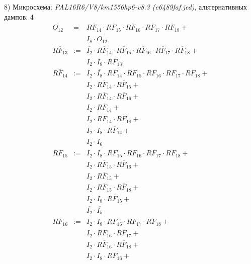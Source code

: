 \documentclass[a4paper,russian]{report}
\begin{document}
8) Микросхема: \emph{PAL16R6/V8/km1556hp6-v8.3  (e6489faf.jed)}, альтернативных дампов: 4
\nopagebreak\begin{eqnarray*}
    \overline{O_{12}} & = & \overline{RF_{14}} \cdotp \overline{RF_{15}} \cdotp \overline{RF_{16}} \cdotp \overline{RF_{17}} \cdotp \overline{RF_{18}} + \\
	& &  I_{8} \cdotp \overline{O_{12}} \\
    \overline{RF_{13}} & := & \overline{I_{2}} \cdotp \overline{RF_{14}} \cdotp \overline{RF_{15}} \cdotp \overline{RF_{16}} \cdotp \overline{RF_{17}} \cdotp \overline{RF_{18}} + \\
	& &  I_{2} \cdotp I_{8} \cdotp \overline{RF_{13}} \\
    \overline{RF_{14}} & := & I_{2} \cdotp \overline{I_{8}} \cdotp RF_{14} \cdotp RF_{15} \cdotp RF_{16} \cdotp RF_{17} \cdotp RF_{18} + \\
	& &  I_{2} \cdotp \overline{RF_{14}} \cdotp \overline{RF_{15}} + \\
	& &  I_{2} \cdotp \overline{RF_{14}} \cdotp \overline{RF_{16}} + \\
	& &  I_{2} \cdotp \overline{RF_{14}} + \\
	& &  I_{2} \cdotp \overline{RF_{14}} \cdotp \overline{RF_{18}} + \\
	& &  I_{2} \cdotp I_{8} \cdotp \overline{RF_{14}} + \\
	& &  \overline{I_{2}} \cdotp \overline{I_{6}} \\
    \overline{RF_{15}} & := & I_{2} \cdotp \overline{I_{8}} \cdotp RF_{15} \cdotp RF_{16} \cdotp RF_{17} \cdotp RF_{18} + \\
	& &  I_{2} \cdotp \overline{RF_{15}} \cdotp \overline{RF_{16}} + \\
	& &  I_{2} \cdotp \overline{RF_{15}} + \\
	& &  I_{2} \cdotp \overline{RF_{15}} \cdotp \overline{RF_{18}} + \\
	& &  I_{2} \cdotp I_{8} \cdotp \overline{RF_{15}} + \\
	& &  \overline{I_{2}} \cdotp \overline{I_{5}} \\
    \overline{RF_{16}} & := & I_{2} \cdotp \overline{I_{8}} \cdotp RF_{16} \cdotp RF_{17} \cdotp RF_{18} + \\
	& &  I_{2} \cdotp \overline{RF_{16}} \cdotp \overline{RF_{17}} + \\
	& &  I_{2} \cdotp \overline{RF_{16}} \cdotp \overline{RF_{18}} + \\
	& &  I_{2} \cdotp I_{8} \cdotp \overline{RF_{16}} + \\

\end{eqnarray*}
\end{document}
